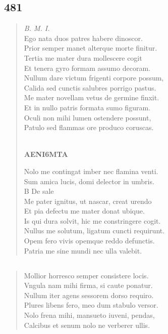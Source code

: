 \documentclass[11pt, a4paper]{report}
\begin{document}
            \subsection*{481}
      \begin{verse}
      \textit{B. M. I.} \\ Ego nata duos patres habere dinoscor. \\ Prior semper manet alterque morte finitur. \\ Tertia me mater dura mollescere cogit \\ Et tenera gyro formam assumo decoram. \\ Nullum dare victum frigenti corpore possum, \\ Calida sed cunctis salubres porrigo pastus. \\ Me mater novellam vetus de germine finxit. \\ Et in nullo patris formata sumo figuram. \\ Oculi non mihi lumen ostendere possunt, \\ Patulo sed flammas ore produco coruscas. \\ 
        ﻿\pagebreak 
    \begin{center} \textbf{AENI6MTA} \end{center} \marginpar{[352]} Nolo me contingat imber nec flamina venti. \\ Sum amica lucis, domi delector in umbris. \\ B De sale \\ Me pater ignitus, ut nascar, creat urendo \\ Et pia defectu me mater donat ubique. \\ Is qui dura solvit, hic me constringere cogit. \\ Nullus me solutum, ligatum cuncti requirunt. \\ Opem fero vivis opemque reddo defunctis. \\ Patria me sine mundi nec ulla valebit. \\ 
      \end{verse}
  
            \subsection*{}
      \begin{verse}
      Mollior horresco semper consistere locis. \\ Vngula nam mihi firma, si caute ponatur. \\ Nullum iter agens sessorem dorso requiro. \\ Plures libens fero, meo dum stabulo versor. \\ Nolo frena mihi, mansueto iuveni, pendas, \\ Calcibus et senum nolo ne verberer ullis. \\ 
      \end{verse}
  
\end{document}
